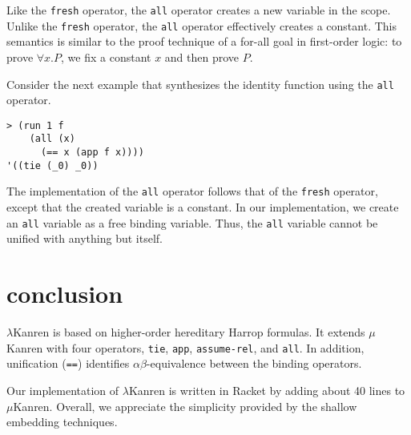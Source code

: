 \documentclass[acmlarge,review]{acmart}
\theoremstyle{definition}
\begin{document}
Like the \texttt{fresh} operator, the \texttt{all} operator creates a new
variable in the scope. Unlike the \texttt{fresh} operator, the \texttt{all}
operator effectively creates a constant. This semantics is similar to the
proof technique of a for-all goal in first-order logic: to prove
$\forall x. P$, we fix a constant $x$ and then prove $P$.

Consider the next example that synthesizes the identity function using the
\texttt{all} operator. 
\begin{lstlisting}
> (run 1 f
    (all (x)
      (== x (app f x))))
'((tie (_0) _0))
\end{lstlisting}

The implementation of the \texttt{all} operator follows that of the
\texttt{fresh} operator, except that the created variable is a constant.
In our implementation, we create an \texttt{all} variable as a free
binding variable. Thus, the \texttt{all} variable cannot be unified
with anything but itself.


\section{conclusion}
$\lambda$Kanren is based on higher-order hereditary Harrop formulas.
It extends $\mu$Kanren with four operators, \texttt{tie},
\texttt{app}, \texttt{assume-rel}, and \texttt{all}. In addition, unification
(\texttt{==}) identifies $\alpha\beta$-equivalence between the binding
operators.

Our implementation of $\lambda$Kanren is written in Racket by adding
about 40 lines to $\mu$Kanren. Overall, we appreciate the simplicity
provided by the shallow embedding techniques.



\end{document}
